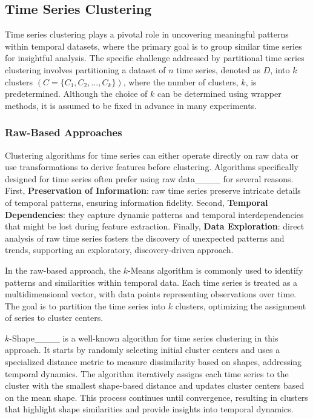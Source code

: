 \subsection{Time Series Clustering}
\label{sec:clus_methods}
Time series clustering plays a pivotal role in uncovering meaningful patterns within temporal datasets, where the primary goal is to group similar time series for insightful analysis. The specific challenge addressed by partitional time series clustering involves partitioning a dataset of $n$ time series, denoted as $D$, into $k$ clusters $(C = \{C_{1}, C_{2}, ..., C_{k}\})$, where the number of clusters, $k$, is predetermined. Although the choice of $k$ can be determined using wrapper methods, it is assumed to be fixed in advance in many experiments. 

\subsubsection{Raw-Based Approaches}

Clustering algorithms for time series can either operate directly on raw data or use transformations to derive features before clustering. Algorithms specifically designed for time series often prefer using raw data____ for several reasons. First, \textbf{Preservation of Information}: raw time series preserve intricate details of temporal patterns, ensuring information fidelity. Second, \textbf{Temporal Dependencies}: they capture dynamic patterns and temporal interdependencies that might be lost during feature extraction. Finally, \textbf{Data Exploration}: direct analysis of raw time series fosters the discovery of unexpected patterns and trends, supporting an exploratory, discovery-driven approach.

In the raw-based approach, the $k$-Means algorithm is commonly used to identify patterns and similarities within temporal data. Each time series is treated as a multidimensional vector, with data points representing observations over time. The goal is to partition the time series into $k$ clusters, optimizing the assignment of series to cluster centers.

$k$-Shape____ is a well-known algorithm for time series clustering in this approach. It starts by randomly selecting initial cluster centers and uses a specialized distance metric to measure dissimilarity based on shapes, addressing temporal dynamics. The algorithm iteratively assigns each time series to the cluster with the smallest shape-based distance and updates cluster centers based on the mean shape. This process continues until convergence, resulting in clusters that highlight shape similarities and provide insights into temporal dynamics.

